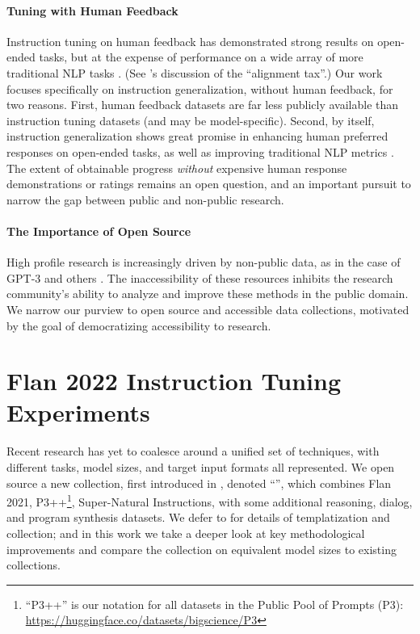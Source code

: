 \vspace{-2mm}
\paragraph{Tuning with Human Feedback}
Instruction tuning on human feedback has demonstrated strong results on open-ended tasks, but at the expense of performance on a wide array of more traditional NLP tasks \citep{ouyang2022training, glaese2022improving, bai2022training, nakano2021webgpt}.
(See \citet{ouyang2022training}'s discussion of the ``alignment tax''.)
Our work focuses specifically on instruction generalization, without human feedback, for two reasons.
First, human feedback datasets are far less publicly available than instruction tuning datasets (and may be model-specific).
Second, by itself, instruction generalization shows great promise in enhancing human preferred responses on open-ended tasks, as well as improving traditional NLP metrics \citep{chung2022scaling}.
The extent of obtainable progress \emph{without} expensive human response demonstrations or ratings remains an open question, and an important pursuit to narrow the gap between public and non-public research.

\paragraph{The Importance of Open Source}

High profile research is increasingly driven by non-public data, as in the case of GPT-3 and others \citep{ouyang2022training, glaese2022improving}.
The inaccessibility of these resources inhibits the research community's ability to analyze and improve these methods in the public domain.
We narrow our purview to open source and accessible data collections, motivated by the goal of democratizing accessibility to research.

\section{Flan 2022 Instruction Tuning Experiments}
\label{sec:flan-it-exps}

Recent research has yet to coalesce around a unified set of techniques, with different tasks, model sizes, and target input formats all represented. 
We open source a new collection, first introduced in \citet{chung2022scaling}, denoted ``\flantwo{}'', which combines Flan 2021, P3++\footnote{``P3++'' is our notation for all datasets in the Public Pool of Prompts (P3): \url{https://huggingface.co/datasets/bigscience/P3}}, Super-Natural Instructions, with some additional reasoning, dialog, and program synthesis datasets.
We defer to \citet{chung2022scaling} for details of templatization and collection; and in this work we take a deeper look at key methodological improvements and compare the collection on equivalent model sizes to existing collections.

